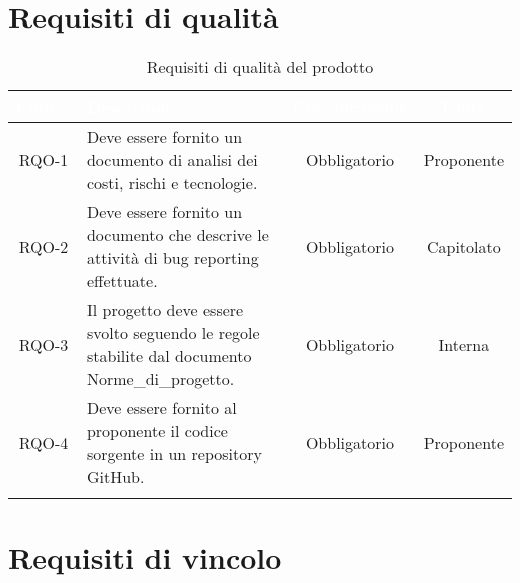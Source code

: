 \section{Requisiti di qualità}

\begingroup
\setlength{\tabcolsep}{10pt}
\renewcommand{\arraystretch}{1.5}
\begin{xltabular}{\textwidth}{| c | X | c | c |}
    \hline
     \textbf{\textcolor{white}{Codice}} & \textbf{\textcolor{white}{Descrizione}} & \textbf{\textcolor{white}{Classificazione}} & \textbf{\textcolor{white}{Fonte}}\\
    \hline
    \endhead
    RQO-1 & Deve essere fornito un documento di analisi dei costi, rischi e tecnologie. & Obbligatorio & Proponente \\
    \hline
    RQO-2 & Deve essere fornito un documento che descrive le attività di bug reporting effettuate. & Obbligatorio & Capitolato \\
    \hline
    RQO-3 & Il progetto deve essere svolto seguendo le regole stabilite dal documento Norme\_di\_progetto. & Obbligatorio & Interna \\
    \hline
    RQO-4 & Deve essere fornito al proponente il codice sorgente in un repository GitHub. & Obbligatorio & Proponente \\
    \hline
     \caption{Requisiti di qualità del prodotto}
    \label{tab:reqqua}
\end{xltabular}
\endgroup

\section{Requisiti di vincolo}

